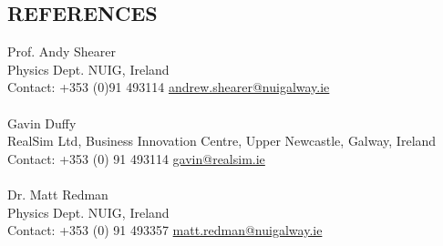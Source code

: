 \documentclass[margin, 10pt]{res} %
\begin{document}
\begin{resume}
\section{REFERENCES}
Prof. Andy Shearer \\
Physics Dept. NUIG, Ireland\\
Contact: +353 (0)91 493114 \hfill \href{mailto:andrew.shearer@nuigalway.ie}{andrew.shearer@nuigalway.ie}\\
\\
Gavin Duffy\\
RealSim Ltd, Business Innovation Centre, Upper Newcastle, Galway, Ireland \\
Contact: +353 (0) 91 493114 \hfill \href{mailto:gavin@realsim.ie}{gavin@realsim.ie}\\
\\
Dr. Matt Redman\\
Physics Dept. NUIG, Ireland\\
Contact: +353 (0) 91 493357 \hfill \href{mailto:matt.redman@nuigalway.ie}{matt.redman@nuigalway.ie}\\

\end{resume}
\end{document}
